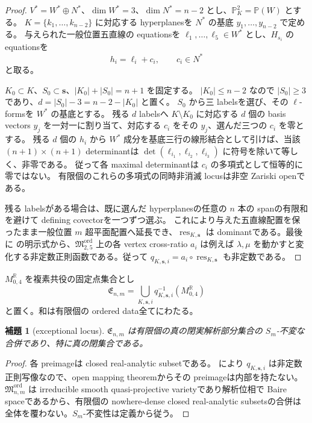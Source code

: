 \documentclass[11pt,a4paper]{ltjsarticle}
\newcommand{\PP}{\mathbb P}
\newcommand{\RR}{\mathbb R}
\newcommand{\Mord}{\mathfrak M^{\mathrm{ord}}}
\theoremstyle{plain}
\newtheorem{lemma}[lemma]{補題}
\theoremstyle{definition}
\theoremstyle{remark}
\begin{document}
\begin{proof}
$V^*=W^*\oplus N^*$、$\dim W^*=3$、$\dim N^*=n-2$ とし、$\PP^2_K=\PP(W)$ とする。
$K=\{k_1,\ldots,k_{n-2}\}$ に対応する hyperplanesを $N^*$ の基底 $y_1,\ldots,y_{n-2}$ で定める。
与えられた一般位置五直線の equationsを $\ell_1,\ldots,\ell_5\in W^*$ とし、$H_{s_i}$ の equationsを
\[
 h_i=\ell_i+c_i,\qquad c_i\in N^*
\]
と取る。

$K_0\subset K$、$S_0\subset\mathbf s$、$|K_0|+|S_0|=n+1$ を固定する。
$|K_0|\le n-2$ なので $|S_0|\ge3$ であり、$d=|S_0|-3=n-2-|K_0|$ と置く。
$S_0$ から三 labelsを選び、その $\ell$-formsを $W^*$ の基底とする。
残る $d$ labelsへ $K\setminus K_0$ に対応する $d$ 個の basis vectors $y_j$ を一対一に割り当て、対応する $c_i$ をその $y_j$、選んだ三つの $c_i$ を零とする。
残る $d$ 個の $h_i$ から $W^*$ 成分を基底三行の線形結合として引けば、当該 $(n+1)\times(n+1)$ determinantは $\det(\ell_{i_1},\ell_{i_2},\ell_{i_3})$ に符号を除いて等しく、非零である。
従って各 maximal determinantは $c_i$ の多項式として恒等的に零ではない。
有限個のこれらの多項式の同時非消滅 locusは非空 Zariski openである。

残る labelsがある場合は、既に選んだ hyperplanesの任意の $n$ 本の spanの有限和を避けて defining covectorを一つずつ選ぶ。
これにより与えた五直線配置を保ったまま一般位置 $m$ 超平面配置へ延長でき、$\operatorname{res}_{K,\mathbf s}$ は dominantである。最後に  の明示式から、$\Mord_{2,5}$ 上の各 vertex cross-ratio $a_i$ は例えば $\lambda,\mu$ を動かすと変化する非定数正則函数である。従って $q_{K,\mathbf s,i}=a_i\circ\operatorname{res}_{K,\mathbf s}$ も非定数である。
\end{proof}

$M_{0,4}^{\RR}$ を複素共役の固定点集合とし
\begin{equation}
\label{eq:exceptional}
 \mathfrak E_{n,m}
 =\bigcup_{K,\mathbf s,i}q_{K,\mathbf s,i}^{-1}(M_{0,4}^{\RR})
\end{equation}
と置く。和は有限個の ordered data全てにわたる。

\begin{lemma}[exceptional locus]
\label{lem:exceptional}
 $\mathfrak E_{n,m}$ は有限個の真の閉実解析部分集合の $S_m$-不変な合併であり、特に真の閉集合である。
\end{lemma}

\begin{proof}
各 preimageは closed real-analytic subsetである。 により $q_{K,\mathbf s,i}$ は非定数正則写像なので、open mapping theoremからその preimageは内部を持たない。$\Mord_{n,m}$ は irreducible smooth quasi-projective varietyであり解析位相で Baire spaceであるから、有限個の nowhere-dense closed real-analytic subsetsの合併は全体を覆わない。$S_m$-不変性は定義から従う。
\end{proof}
\end{document}
